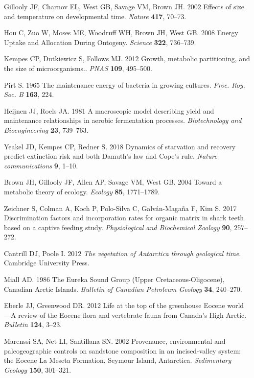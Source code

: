 \documentclass[]{rsos}%
\begin{document}
\begin{thebibliography}{99}
Gillooly JF, Charnov EL, West GB, Savage VM, Brown JH. 2002  {Effects of size
  and temperature on developmental time}. {\em Nature} \textbf{417}, 70--73.

Hou C, Zuo W, Moses ME, Woodruff WH, Brown JH, West GB. 2008  {Energy Uptake
  and Allocation During Ontogeny}. {\em Science} \textbf{322}, 736--739.

Kempes CP, Dutkiewicz S, Follows MJ. 2012  {Growth, metabolic partitioning, and
  the size of microorganisms.}. {\em PNAS} \textbf{109}, 495--500.

Pirt S. 1965  {The maintenance energy of bacteria in growing cultures}. {\em
  Proc. Roy. Soc. B} \textbf{163}, 224.

Heijnen JJ, Roels JA. 1981  {A macroscopic model describing yield and
  maintenance relationships in aerobic fermentation processes}. {\em
  Biotechnology and Bioengineering} \textbf{23}, 739--763.

Yeakel JD, Kempes CP, Redner S. 2018  Dynamics of starvation and recovery
  predict extinction risk and both Damuth’s law and Cope’s rule. {\em
  Nature communications} \textbf{9}, 1--10.

Brown JH, Gillooly JF, Allen AP, Savage VM, West GB. 2004  {Toward a metabolic
  theory of ecology}. {\em Ecology} \textbf{85}, 1771--1789.

Zeichner S, Colman A, Koch P, Polo-Silva C, Galv{\'a}n-Maga{\~n}a F, Kim S.
  2017  Discrimination factors and incorporation rates for organic matrix in
  shark teeth based on a captive feeding study. {\em Physiological and
  Biochemical Zoology} \textbf{90}, 257--272.

Cantrill DJ, Poole I. 2012 {\em The vegetation of Antarctica through geological
  time}.
Cambridge University Press.

Miall AD. 1986  The Eureka Sound Group (Upper Cretaceous-Oligocene), Canadian
  Arctic Islands. {\em Bulletin of Canadian Petroleum Geology} \textbf{34},
  240--270.

Eberle JJ, Greenwood DR. 2012  Life at the top of the greenhouse Eocene
  world—A review of the Eocene flora and vertebrate fauna from Canada’s
  High Arctic. {\em Bulletin} \textbf{124}, 3--23.

Marenssi SA, Net LI, Santillana SN. 2002  Provenance, environmental and
  paleogeographic controls on sandstone composition in an incised-valley
  system: the Eocene La Meseta Formation, Seymour Island, Antarctica. {\em
  Sedimentary Geology} \textbf{150}, 301--321.


\end{thebibliography}
\end{document}
